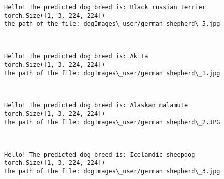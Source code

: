 \documentclass[11pt]{article}
\begin{document}
    \begin{Verbatim}[commandchars=\\\{\}]
Hello! The predicted dog breed is: Black russian terrier
torch.Size([1, 3, 224, 224])
the path of the file: dogImages\_user/german shepherd\_5.jpg

    \end{Verbatim}

    \begin{center}
    \end{center}
    { \hspace*{\fill} \\}
    
    \begin{Verbatim}[commandchars=\\\{\}]
Hello! The predicted dog breed is: Akita
torch.Size([1, 3, 224, 224])
the path of the file: dogImages\_user/german shepherd\_1.jpg

    \end{Verbatim}

    \begin{center}
    \end{center}
    { \hspace*{\fill} \\}
    
    \begin{Verbatim}[commandchars=\\\{\}]
Hello! The predicted dog breed is: Alaskan malamute
torch.Size([1, 3, 224, 224])
the path of the file: dogImages\_user/german shepherd\_2.JPG

    \end{Verbatim}

    \begin{center}
    \end{center}
    { \hspace*{\fill} \\}
    
    \begin{Verbatim}[commandchars=\\\{\}]
Hello! The predicted dog breed is: Icelandic sheepdog
torch.Size([1, 3, 224, 224])
the path of the file: dogImages\_user/german shepherd\_3.jpg

    \end{Verbatim}
\end{document}
